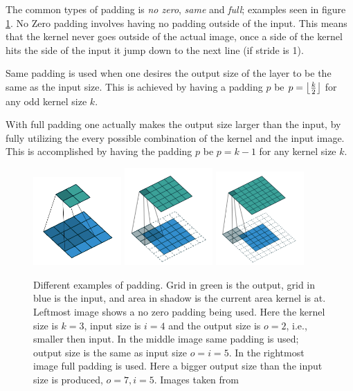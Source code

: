  The common types of padding is \textit{no zero}, \textit{same} and \textit{full}; examples seen in figure \ref{fig:padding}. No Zero padding involves having no padding outside of the input. This means that the kernel never goes outside of the actual image, once a side of the kernel hits the side of the input it jump down to the next line (if stride is 1). 
 
 Same padding is used when one desires the output size of the layer to be the same as the input size. This is achieved by having a padding $p$ be $ p = \left\lfloor \frac{k}{2} \right\rfloor $ for any odd kernel size $k$.
  
 With full padding one actually makes the output size larger than the input, by fully utilizing the every possible combination of the kernel and the input image. This is accomplished  by having the padding $p $ be $p = k - 1$ for any kernel size $k$. 
 
 
 \begin{figure}[hbtp]
\begin{center}
\includegraphics[width = 0.3\textwidth]{./Images/noPad.png}
\includegraphics[width = 0.3\textwidth]{./Images/samePad.png}
\includegraphics[width = 0.3\textwidth]{./Images/fullPad.png} 
\caption{Different examples of padding. Grid in green is the output, grid in blue is the input, and area in shadow is the current area kernel is at. Leftmost image shows a no zero padding being used. Here the kernel size is $k = 3$, input size is $i = 4$ and the output size is  $o = 2$, i.e., smaller then input.  In the middle image same padding is used; output size is the same as input size $o = i = 5$. In the rightmost image full padding is used. Here a bigger output size than the input size is produced, $o = 7, i = 5$. Images taken from \cite{convArit}}
\label{fig:padding}
\end{center}
\end{figure}
 
